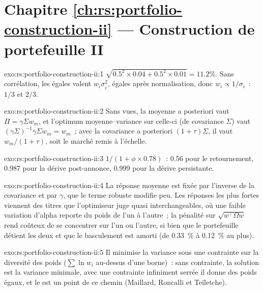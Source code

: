 \section*{Chapitre \ref{ch:rs:portfolio-construction-ii} --- Construction de portefeuille II}

\begin{solution}{exo:rs:portfolio-construction-ii:1}
$\sqrt{0.5^2 \times 0.04 + 0.5^2 \times 0.01} = 11.2\%$. Sans corrélation, les  égales valent $w_i\sigma_i^2$, égales après normalisation, donc
$w_i \propto 1/\sigma_i$~: $1/3$ et $2/3$.
\end{solution}

\begin{solution}{exo:rs:portfolio-construction-ii:2}
Sans vues, la moyenne a posteriori vaut $\Pi = \gamma\Sigma w_m$, et l'optimum moyenne--variance sur celle-ci (de covariance $\Sigma$) vaut $(\gamma\Sigma)^{-1}\gamma\Sigma w_m = w_m$~;
avec la covariance a posteriori $(1+\tau)\Sigma$, il vaut $w_m/(1+\tau)$, soit le marché remis à l'échelle.
\end{solution}

\begin{solution}{exo:rs:portfolio-construction-ii:3}
$1/(1 + \phi \times 0.78)$~: 0.56 pour le retournement, 0.987 pour la dérive post-annonce, 0.999 pour la dérive persistante.
\end{solution}

\begin{solution}{exo:rs:portfolio-construction-ii:4}
La réponse moyenne est fixée par l'inverse de la covariance et par $\gamma$, que le terme robuste modifie peu. Les réponses les plus fortes viennent des titres que l'optimiseur
juge quasi interchangeables, où une faible variation d'alpha reporte du poids de l'un à l'autre~; la pénalité sur $\sqrt{w^\top\Omega w}$ rend coûteux de se concentrer sur l'un ou
l'autre, si bien que le portefeuille détient les deux et que le basculement est amorti (de 0.33~\% à 0.12~\% au plus).
\end{solution}

\begin{solution}{exo:rs:portfolio-construction-ii:5}
Il minimise la variance sous une contrainte sur la diversité des poids ($\sum\ln w_i$ au-dessus d'une borne)~: sans contrainte, la solution est la variance minimale,
avec une contrainte infiniment serrée il donne des poids égaux, et le  est un point de ce chemin (Maillard, Roncalli et Teïletche).
\end{solution}

